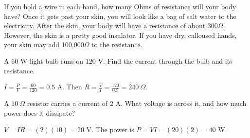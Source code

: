 
If you hold a wire in each hand, how many Ohms of resistance will your
body have? Once it gets past your skin, you will look like a bag of
salt water to the electricity. After the skin, your body will have a
resistance of about 300$\Omega$. However, the skin is a pretty good
insulator. If you have dry, calloused hands, your skin may add
100,000$\Omega$ to the resistance.


\begin{Exercise}[title={Resistance of a Bulb}, label=dc1_bulb]
A $60$ W light bulb runs on $120$ V. Find the current through the bulb and its resistance.
\end{Exercise}
\begin{Answer}[ref=dc1_bulb]
$I = \frac{P}{V} = \frac{60}{120} = 0.5$ A. Then $R = \frac{V}{I} = \frac{120}{0.5} = 240\ \Omega$.
\end{Answer}

\begin{Exercise}[title={Voltage Across a Resistor}, label=dc1_voltage]
A $10\ \Omega$ resistor carries a current of $2$ A. What voltage is across it, and how much power does it dissipate?
\end{Exercise}
\begin{Answer}[ref=dc1_voltage]
$V = IR = (2)(10) = 20$ V. The power is $P = VI = (20)(2) = 40$ W.
\end{Answer}
